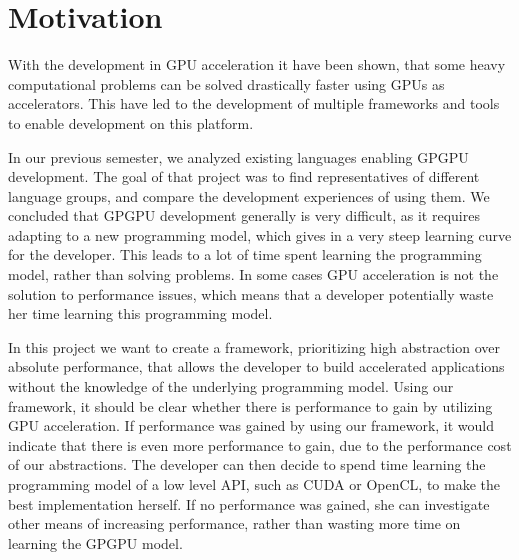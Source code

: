 \section{Motivation}\label{cha:motivation}
With the development in GPU acceleration it have been shown, that some heavy computational problems can be solved drastically faster using GPUs as accelerators. This have led to the development of multiple frameworks and tools to enable development on this platform.

In our previous semester\cite{sw9Report}, we analyzed existing languages enabling GPGPU development. The goal of that project was to find representatives of different language groups, and compare the development experiences of using them. We concluded that GPGPU development generally is very difficult, as it requires adapting to a new programming model, which gives in a very steep learning curve for the developer. This leads to a lot of time spent learning the programming model, rather than solving problems. In some cases GPU acceleration is not the solution to performance issues, which means that a developer potentially waste her time learning this programming model.



In this project we want to create a framework, prioritizing high abstraction over absolute performance, that allows the developer to build accelerated applications without the knowledge of the underlying programming model. Using our framework, it should be clear whether there is performance to gain by utilizing GPU acceleration. If performance was gained by using our framework, it would indicate that there is even more performance to gain, due to the performance cost of our abstractions. The developer can then decide to spend time learning the programming model of a low level API, such as CUDA or OpenCL, to make the best implementation herself. If no performance was gained, she can investigate other means of increasing performance, rather than wasting more time on learning the GPGPU model.


